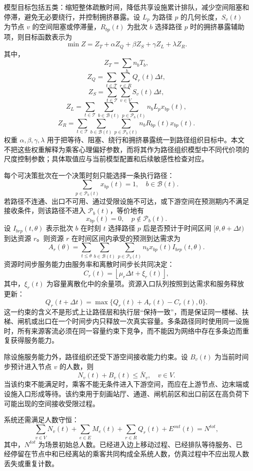 \documentclass[UTF8,a4paper,12pt]{ctexart}
\begin{document}
模型目标包括五类：缩短整体疏散时间，降低共享设施累计排队，减少空间阻塞和停滞，避免无必要绕行，并控制拥挤暴露。设 \(L_p\) 为路径 \(p\) 的几何长度，\(S_v(t)\) 为节点 \(v\) 的空间阻塞或停滞量，\(R_{bp}(t)\) 为批次 \(b\) 选择路径 \(p\) 时的拥挤暴露辅助项，则目标函数表示为
\[
\min Z=Z_T+\alpha Z_Q+\beta Z_S+\gamma Z_L+\lambda Z_R.
\]
其中，
\[
Z_T=\sum_{b} n_b T_b,
\]
\[
Z_Q=\sum_{t\in\mathcal T}\sum_{r\in R} Q_r(t)\Delta t,
\]
\[
Z_S=\sum_{t\in\mathcal T}\sum_{v\in V} S_v(t)\Delta t,
\]
\[
Z_L=\sum_{t\in\mathcal T}\sum_{b\in\mathcal B(t)}\sum_{p\in\mathcal P_b(t)}n_b L_p x_{bp}(t),
\]
\[
Z_R=\sum_{t\in\mathcal T}\sum_{b\in\mathcal B(t)}\sum_{p\in\mathcal P_b(t)}n_b R_{bp}(t)x_{bp}(t).
\]
权重 \(\alpha,\beta,\gamma,\lambda\) 用于把等待、阻塞、绕行和拥挤暴露统一到路径组织目标中。本文不把这些权重解释为乘客心理偏好参数，而将其作为路径组织模型中不同代价项的尺度控制参数；具体取值应与当前模型配置和后续敏感性检查对应。

每个可决策批次在一个决策时刻只能选择一条执行路径：
\[
\sum_{p\in\mathcal P_b(t)}x_{bp}(t)=1,\quad b\in\mathcal B(t).
\]
若路径不连通、出口不可用、通过受限设施不可达，或下游空间在预测期内不满足接收条件，则该路径不进入 \(\mathcal P_b(t)\)，等价地有
\[
x_{bp}(t)=0,\quad p\notin\mathcal P_b(t).
\]
设 \(I_{brp}(t,\theta)\) 表示批次 \(b\) 在时刻 \(t\) 选择路径 \(p\) 后是否预计于时间区间 \([\theta,\theta+\Delta t)\) 到达资源 \(r\)。则资源 \(r\) 在时间区间内承受的预测到达需求为
\[
A_r(\theta)=\sum_{t\leq \theta}\sum_{b\in\mathcal B(t)}\sum_{p\in\mathcal P_b(t)} n_b x_{bp}(t)I_{brp}(t,\theta).
\]
资源时间步服务能力由服务率和离散时间步长共同决定：
\[
C_r(t)=\left\lfloor \mu_r\Delta t+\xi_r(t)\right\rfloor,
\]
其中，\(\xi_r(t)\) 为容量离散化中的余量项。资源入口队列按照到达需求和服务释放更新：
\[
Q_r(t+\Delta t)=\max\{Q_r(t)+A_r(t)-C_r(t),0\}.
\]
这一约束的含义不是形式上让路径层和执行层“保持一致”，而是保证同一楼梯、扶梯、闸机或出口在一个时间步内只释放一次真实容量。多条路径同时使用同一设施时，所有来源客流必须在同一容量约束下竞争，而不能因为网络中存在多条边而重复获得服务能力。

除设施服务能力外，路径组织还受下游空间接收能力约束。设 \(B_v(t)\) 为当前时间步预计进入节点 \(v\) 的人数，则
\[
N_v(t)+B_v(t)\leq \bar N_v,\quad v\in V.
\]
当该约束不能满足时，乘客不能无条件进入下游空间，而应在上游节点、边末端或设施入口形成等待。该约束用于刻画站厅、通道、闸机前区和出口前区在高负荷下可能出现的空间接收受限过程。

系统还需满足人数守恒：
\[
\sum_{v\in V}N_v(t)+\sum_{e\in E}M_e(t)+\sum_{r\in R}Q_r(t)+E^{out}(t)=N^{tot},
\]
其中，\(N^{tot}\) 为场景初始总人数。已经进入边上移动过程、已经排队等待服务、已经停留在节点中和已经离站的乘客共同构成全系统人数，仿真过程中不应出现人数丢失或重复计数。
\end{document}
